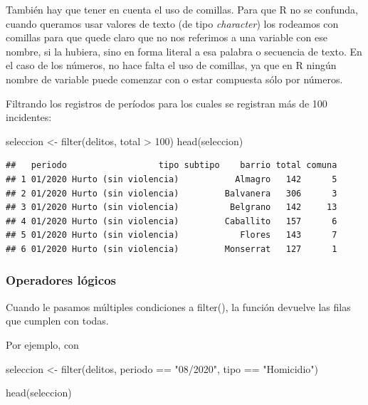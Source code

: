 \documentclass[
]{book}
\newenvironment{Shaded}{\begin{snugshade}}{\end{snugshade}}
\newcommand{\DecValTok}[1]{\textcolor[rgb]{0.00,0.00,0.81}{#1}}
\newcommand{\FunctionTok}[1]{\textcolor[rgb]{0.00,0.00,0.00}{#1}}
\newcommand{\NormalTok}[1]{#1}
\newcommand{\OtherTok}[1]{\textcolor[rgb]{0.56,0.35,0.01}{#1}}
\newcommand{\SpecialCharTok}[1]{\textcolor[rgb]{0.00,0.00,0.00}{#1}}
\newcommand{\StringTok}[1]{\textcolor[rgb]{0.31,0.60,0.02}{#1}}
\begin{document}
También hay que tener en cuenta el uso de comillas. Para que R no se confunda, cuando queramos usar valores de texto (de tipo \emph{character}) los rodeamos con comillas para que quede claro que no nos referimos a una variable con ese nombre, si la hubiera, sino en forma literal a esa palabra o secuencia de texto. En el caso de los números, no hace falta el uso de comillas, ya que en R ningún nombre de variable puede comenzar con o estar compuesta sólo por números.

Filtrando los registros de períodos para los cuales se registran más de 100 incidentes:

\begin{Shaded}
\begin{Highlighting}[]
\NormalTok{seleccion }\OtherTok{\textless{}{-}} \FunctionTok{filter}\NormalTok{(delitos, total }\SpecialCharTok{\textgreater{}} \DecValTok{100}\NormalTok{)}
\FunctionTok{head}\NormalTok{(seleccion)}
\end{Highlighting}
\end{Shaded}

\begin{verbatim}
##   periodo                  tipo subtipo    barrio total comuna
## 1 01/2020 Hurto (sin violencia)           Almagro   142      5
## 2 01/2020 Hurto (sin violencia)         Balvanera   306      3
## 3 01/2020 Hurto (sin violencia)          Belgrano   142     13
## 4 01/2020 Hurto (sin violencia)         Caballito   157      6
## 5 01/2020 Hurto (sin violencia)            Flores   143      7
## 6 01/2020 Hurto (sin violencia)         Monserrat   127      1
\end{verbatim}

\hypertarget{operadores-luxf3gicos}{%
\subsubsection{Operadores lógicos}\label{operadores-luxf3gicos}}

Cuando le pasamos múltiples condiciones a filter(), la función devuelve las filas que cumplen con todas.

Por ejemplo, con

\begin{Shaded}
\begin{Highlighting}[]
\NormalTok{seleccion }\OtherTok{\textless{}{-}} \FunctionTok{filter}\NormalTok{(delitos, periodo }\SpecialCharTok{==} \StringTok{"08/2020"}\NormalTok{,  tipo }\SpecialCharTok{==} \StringTok{"Homicidio"}\NormalTok{)}

\FunctionTok{head}\NormalTok{(seleccion)}
\end{Highlighting}
\end{Shaded}
\end{document}
